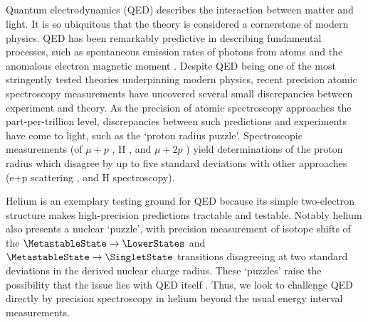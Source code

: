 	\subsection{}
		Quantum electrodynamics (QED) describes the interaction between matter and light. It is so ubiquitous that the theory is considered a cornerstone of modern physics.
		QED has been remarkably predictive in describing fundamental processes, such as spontaneous emission rates of photons from atoms and the anomalous electron magnetic moment \cite{Aoyama15}.
		Despite QED being one of the most stringently tested theories underpinning modern physics, recent precision atomic spectroscopy measurements have uncovered several small discrepancies between experiment and theory.  
		As the precision of atomic spectroscopy approaches the part-per-trillion level, discrepancies between such predictions and experiments have come to light, such as the `proton radius puzzle'. Spectroscopic measurements (of $\mu+p$ \cite{Pohl10}, H \cite{Bezginov19,Beyer17}, and $\mu +2p$ \cite{Pohl16}) yield determinations of the proton radius which disagree by up to five standard deviations with other approaches (e+p scattering \cite{Zhan11}, and H spectroscopy\cite{Fleurbaey18}). 

		Helium is an exemplary testing ground for QED because its simple two-electron structure makes high-precision predictions tractable and testable. Notably helium also presents a nuclear `puzzle', with precision measurement of isotope shifts of the \(\MetastableState \rightarrow \LowerStates \) \cite{Zheng17} and \(\MetastableState \rightarrow \SingletState \) \cite{Rengelink18} transitions disagreeing at two standard deviations in the derived nuclear charge radius. These `puzzles' raise the possibility that the issue lies with QED itself \cite{Hill17}. Thus, we look to challenge QED directly by precision spectroscopy in helium beyond the usual energy interval measurements.

